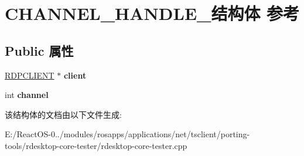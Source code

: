 \hypertarget{struct_c_h_a_n_n_e_l___h_a_n_d_l_e__}{}\section{C\+H\+A\+N\+N\+E\+L\+\_\+\+H\+A\+N\+D\+L\+E\+\_\+结构体 参考}
\label{struct_c_h_a_n_n_e_l___h_a_n_d_l_e__}
\subsection*{Public 属性}
\begin{DoxyCompactItemize}
\item 
\mbox{\label{struct_c_h_a_n_n_e_l___h_a_n_d_l_e___a1995a01361885477c1d5501f54ba2c1d}} 
\hyperlink{structrdpclient}{R\+D\+P\+C\+L\+I\+E\+NT} $\ast$ {\bfseries client}
\item 
\mbox{\label{struct_c_h_a_n_n_e_l___h_a_n_d_l_e___a426e003ef7d91145ce523140c9263a6c}} 
int {\bfseries channel}
\end{DoxyCompactItemize}


该结构体的文档由以下文件生成\+:\begin{DoxyCompactItemize}
\item 
E\+:/\+React\+O\+S-\/0../modules/rosapps/applications/net/tsclient/porting-\/tools/rdesktop-\/core-\/tester/rdesktop-\/core-\/tester.\+cpp\end{DoxyCompactItemize}
